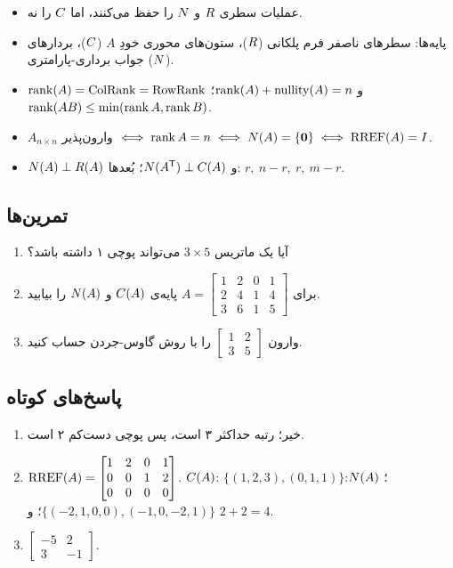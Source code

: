 \begin{summary}
\begin{itemize}
  \item عملیات سطری $R$ و $N$ را حفظ می‌کنند، اما $C$ را نه.
  \item پایه‌ها: سطرهای ناصفر فرم پلکانی ($R$)، ستون‌های محوری خودِ $A$ ($C$)، بردارهای جواب برداری-پارامتری ($N$).
  \item $\operatorname{rank}(A)=\operatorname{ColRank}=\operatorname{RowRank}$ و $\operatorname{rank}(A)+\operatorname{nullity}(A)=n$؛ $\operatorname{rank}(AB)\le\min(\operatorname{rank} A,\operatorname{rank} B)$.
  \item $A_{n\times n}$ وارون‌پذیر $\iff\operatorname{rank} A=n\iff N(A)=\{\mathbf{0}\}\iff\operatorname{RREF}(A)=I$.
  \item $N(A)\perp R(A)$ و $N(A^{\mathsf{T}})\perp C(A)$؛ بُعدها: $r,\ n-r,\ r,\ m-r$.
\end{itemize}
\end{summary}

\subsection*{تمرین‌ها}
\begin{enumerate}
  \item آیا یک ماتریس $3\times5$ می‌تواند پوچی ۱ داشته باشد؟
  \item برای $A=\begin{bmatrix}1&2&0&1\\2&4&1&4\\3&6&1&5\end{bmatrix}$ پایه‌ی $C(A)$ و $N(A)$ را بیابید.
  \item وارون  $\begin{bmatrix}1&2\\3&5\end{bmatrix}$ را با روش گاوس-جردن  حساب کنید.
\end{enumerate}

\subsection*{پاسخ‌های کوتاه}
\begin{enumerate}
  \item خیر؛ رتبه حداکثر ۳ است، پس پوچی دست‌کم ۲ است.
  \item $\operatorname{RREF}(A)=\begin{bmatrix}1&2&0&1\\0&0&1&2\\0&0&0&0\end{bmatrix}$. $C(A)$: $\{(1,2,3),(0,1,1)\}$؛ $N(A)$: $\{(-2,1,0,0),(-1,0,-2,1)\}$؛ و $2+2=4$.
  \item $\begin{bmatrix}-5&2\\3&-1\end{bmatrix}$.
\end{enumerate}
